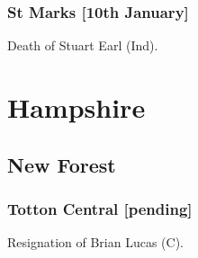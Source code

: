 \documentclass[a4paper,openany]{book}
\begin{document}
\begin{resultsiii}
\subsubsection*{St Marks \hspace*{\fill}\nolinebreak[1]%
	\enspace\hspace*{\fill}
	[10th January]}


Death of Stuart Earl (Ind).

\section{Hampshire}

\subsection*{New Forest}

\subsubsection*{Totton Central \hspace*{\fill}\nolinebreak[1]%
	\enspace\hspace*{\fill}
	[pending]}


Resignation of Brian Lucas (C).

%
%
%
%
%


\end{resultsiii}
\end{document}
